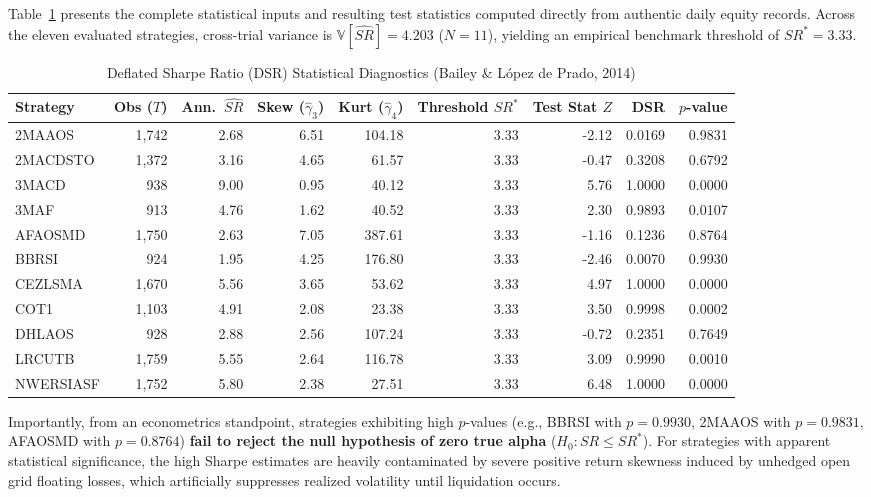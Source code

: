 \documentclass[11pt,a4paper]{article}
\begin{document}
Table~\ref{tab:dsr} presents the complete statistical inputs and resulting test statistics computed directly from authentic daily equity records. Across the eleven evaluated strategies, cross-trial variance is $\mathbb{V}[\widehat{SR}] = 4.203$ ($N = 11$), yielding an empirical benchmark threshold of $SR^* = 3.33$.

\begin{table}[H]
\centering
\footnotesize
\setlength{\tabcolsep}{2pt}
\caption{Deflated Sharpe Ratio (DSR) Statistical Diagnostics (Bailey \& L{\'o}pez de Prado, 2014)}
\label{tab:dsr}
\begin{tabular*}{\textwidth}{@{\extracolsep{\fill}}lrrrrrrrr@{}}
\toprule
\textbf{Strategy} & \textbf{Obs ($T$)} & \textbf{Ann.~$\widehat{SR}$} & \textbf{Skew ($\hat{\gamma}_3$)} & \textbf{Kurt ($\hat{\gamma}_4$)} & \textbf{Threshold $SR^*$} & \textbf{Test Stat $Z$} & \textbf{DSR} & \textbf{$p$-value} \\
\midrule
2MAAOS & 1,742 & 2.68 & 6.51 & 104.18 & 3.33 & -2.12 & 0.0169 & 0.9831 \\
2MACDSTO & 1,372 & 3.16 & 4.65 & 61.57 & 3.33 & -0.47 & 0.3208 & 0.6792 \\
3MACD & 938 & 9.00 & 0.95 & 40.12 & 3.33 & 5.76 & 1.0000 & 0.0000 \\
3MAF & 913 & 4.76 & 1.62 & 40.52 & 3.33 & 2.30 & 0.9893 & 0.0107 \\
AFAOSMD & 1,750 & 2.63 & 7.05 & 387.61 & 3.33 & -1.16 & 0.1236 & 0.8764 \\
BBRSI & 924 & 1.95 & 4.25 & 176.80 & 3.33 & -2.46 & 0.0070 & 0.9930 \\
CEZLSMA & 1,670 & 5.56 & 3.65 & 53.62 & 3.33 & 4.97 & 1.0000 & 0.0000 \\
COT1 & 1,103 & 4.91 & 2.08 & 23.38 & 3.33 & 3.50 & 0.9998 & 0.0002 \\
DHLAOS & 928 & 2.88 & 2.56 & 107.24 & 3.33 & -0.72 & 0.2351 & 0.7649 \\
LRCUTB & 1,759 & 5.55 & 2.64 & 116.78 & 3.33 & 3.09 & 0.9990 & 0.0010 \\
NWERSIASF & 1,752 & 5.80 & 2.38 & 27.51 & 3.33 & 6.48 & 1.0000 & 0.0000 \\
\bottomrule
\end{tabular*}
\end{table}

Importantly, from an econometrics standpoint, strategies exhibiting high $p$-values (e.g., BBRSI with $p = 0.9930$, 2MAAOS with $p = 0.9831$, AFAOSMD with $p = 0.8764$) \textbf{fail to reject the null hypothesis of zero true alpha} ($H_0: SR \le SR^*$). For strategies with apparent statistical significance, the high Sharpe estimates are heavily contaminated by severe positive return skewness induced by unhedged open grid floating losses, which artificially suppresses realized volatility until liquidation occurs.
\end{document}
